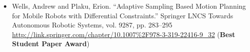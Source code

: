 \begin{itemize}
\vspace{8pt} 

\item[]{Wells, Andrew and Plaku, Erion.  “Adaptive Sampling Based Motion Planning for Mobile Robots with Differential Constraints.” Springer LNCS Towards Autonomous Robotic Systems, vol. 9287, pp. 283–295 \url{http://link.springer.com/chapter/10.1007%2F978-3-319-22416-9_32} (\textbf{Best Student Paper Award})}



\end{itemize}